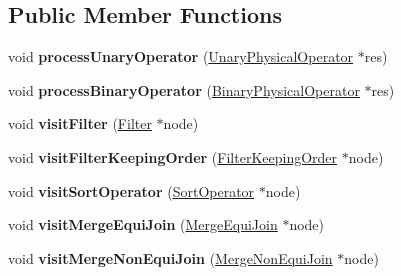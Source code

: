 \subsection*{Public Member Functions}
\begin{DoxyCompactItemize}
\item 
\hypertarget{class_cloning_physical_operator_visitor_ac57b783d90f26dd8c1a9418aab5ab2a6}{void {\bfseries process\+Unary\+Operator} (\hyperlink{class_unary_physical_operator}{Unary\+Physical\+Operator} $\ast$res)}\label{class_cloning_physical_operator_visitor_ac57b783d90f26dd8c1a9418aab5ab2a6}

\item 
\hypertarget{class_cloning_physical_operator_visitor_a47cf1dcc2e5dedb2328f66676de4102b}{void {\bfseries process\+Binary\+Operator} (\hyperlink{class_binary_physical_operator}{Binary\+Physical\+Operator} $\ast$res)}\label{class_cloning_physical_operator_visitor_a47cf1dcc2e5dedb2328f66676de4102b}

\item 
\hypertarget{class_cloning_physical_operator_visitor_ac1b811ff2fd316b05d64f85c2e87fd9c}{void {\bfseries visit\+Filter} (\hyperlink{class_filter}{Filter} $\ast$node)}\label{class_cloning_physical_operator_visitor_ac1b811ff2fd316b05d64f85c2e87fd9c}

\item 
\hypertarget{class_cloning_physical_operator_visitor_a41aff61c8da3a7b88beddb6aaffb211e}{void {\bfseries visit\+Filter\+Keeping\+Order} (\hyperlink{class_filter_keeping_order}{Filter\+Keeping\+Order} $\ast$node)}\label{class_cloning_physical_operator_visitor_a41aff61c8da3a7b88beddb6aaffb211e}

\item 
\hypertarget{class_cloning_physical_operator_visitor_a5bb911312d752fcc31b48bb21f658bdf}{void {\bfseries visit\+Sort\+Operator} (\hyperlink{class_sort_operator}{Sort\+Operator} $\ast$node)}\label{class_cloning_physical_operator_visitor_a5bb911312d752fcc31b48bb21f658bdf}

\item 
\hypertarget{class_cloning_physical_operator_visitor_ae1eb095ee91c30030c7830a9b999a6ec}{void {\bfseries visit\+Merge\+Equi\+Join} (\hyperlink{class_merge_equi_join}{Merge\+Equi\+Join} $\ast$node)}\label{class_cloning_physical_operator_visitor_ae1eb095ee91c30030c7830a9b999a6ec}

\item 
\hypertarget{class_cloning_physical_operator_visitor_a6b17fd37e070917db7152f869517eb4a}{void {\bfseries visit\+Merge\+Non\+Equi\+Join} (\hyperlink{class_merge_non_equi_join}{Merge\+Non\+Equi\+Join} $\ast$node)}\label{class_cloning_physical_operator_visitor_a6b17fd37e070917db7152f869517eb4a}


\end{DoxyCompactItemize}
